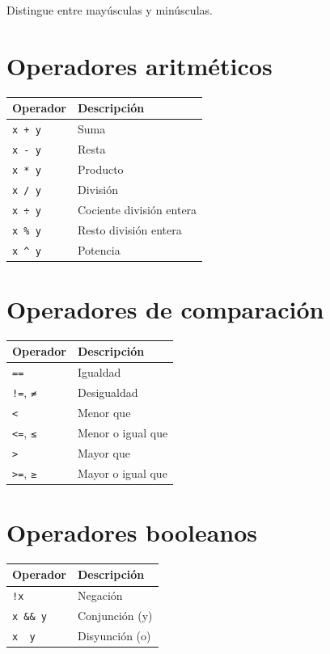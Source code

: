 \documentclass[
  letterpaper,
  DIV=11,
  numbers=noendperiod]{scrreprt}
\begin{document}
Distingue entre mayúsculas y minúsculas.

\hypertarget{operadores-aritmuxe9ticos}{%
\section{Operadores aritméticos}\label{operadores-aritmuxe9ticos}}

\begin{longtable}[]{@{}ll@{}}
\toprule()
Operador & Descripción \\
\midrule()
\endhead
\texttt{x\ +\ y} & Suma \\
\texttt{x\ -\ y} & Resta \\
\texttt{x\ *\ y} & Producto \\
\texttt{x\ /\ y} & División \\
\texttt{x\ ÷\ y} & Cociente división entera \\
\texttt{x\ \%\ y} & Resto división entera \\
\texttt{x\ \^{}\ y} & Potencia \\
\bottomrule()
\end{longtable}

\hypertarget{operadores-de-comparaciuxf3n}{%
\section{Operadores de comparación}\label{operadores-de-comparaciuxf3n}}

\begin{longtable}[]{@{}ll@{}}
\toprule()
Operador & Descripción \\
\midrule()
\endhead
\texttt{==} & Igualdad \\
\texttt{!=}, \texttt{≠} & Desigualdad \\
\texttt{\textless{}} & Menor que \\
\texttt{\textless{}=}, \texttt{≤} & Menor o igual que \\
\texttt{\textgreater{}} & Mayor que \\
\texttt{\textgreater{}=}, \texttt{≥} & Mayor o igual que \\
\bottomrule()
\end{longtable}

\hypertarget{operadores-booleanos}{%
\section{Operadores booleanos}\label{operadores-booleanos}}

\begin{longtable}[]{@{}ll@{}}
\toprule()
Operador & Descripción \\
\midrule()
\endhead
\texttt{!x} & Negación \\
\texttt{x\ \&\&\ y} & Conjunción (y) \\
\texttt{x\ \textbar{}\textbar{}\ y} & Disyunción (o) \\
\bottomrule()
\end{longtable}
\end{document}
